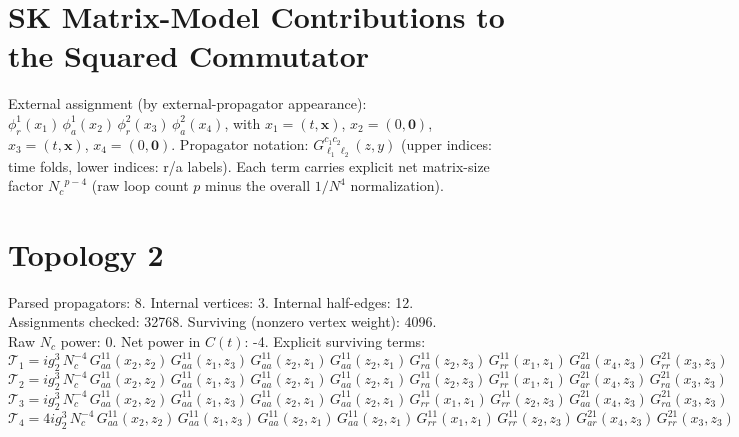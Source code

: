 \documentclass{article}
\begin{document}
\section*{SK Matrix-Model Contributions to the Squared Commutator}
External assignment (by external-propagator appearance): $\phi_r^1(x_1)\,\phi_a^1(x_2)\,\phi_r^2(x_3)\,\phi_a^2(x_4)$, with $x_1=(t,\mathbf{x})$, $x_2=(0,\mathbf{0})$, $x_3=(t,\mathbf{x})$, $x_4=(0,\mathbf{0})$.
Propagator notation: $G^{c_1 c_2}_{\ell_1\ell_2}(z,y)$ (upper indices: time folds, lower indices: r/a labels).
Each term carries explicit net matrix-size factor ${N_c}^{p-4}$ (raw loop count $p$ minus the overall $1/N^4$ normalization).
\section*{Topology 2}
\noindent Parsed propagators: 8. Internal vertices: 3. Internal half-edges: 12.\\
\noindent Assignments checked: 32768. Surviving (nonzero vertex weight): 4096.\\
\noindent Raw $N_c$ power: 0. Net power in $C(t)$: -4.
\noindent Explicit surviving terms:
\begin{equation*}
\mathcal{T}_{1} = i g_{2}^{3}\,N_c^{-4}\,G^{11}_{aa}\left(x_2,z_{2}\right) \, G^{11}_{aa}\left(z_{1},z_{3}\right) \, G^{11}_{aa}\left(z_{2},z_{1}\right) \, G^{11}_{aa}\left(z_{2},z_{1}\right) \, G^{11}_{ra}\left(z_{2},z_{3}\right) \, G^{11}_{rr}\left(x_1,z_{1}\right) \, G^{21}_{aa}\left(x_4,z_{3}\right) \, G^{21}_{rr}\left(x_3,z_{3}\right)
\end{equation*}
\begin{equation*}
\mathcal{T}_{2} = i g_{2}^{3}\,N_c^{-4}\,G^{11}_{aa}\left(x_2,z_{2}\right) \, G^{11}_{aa}\left(z_{1},z_{3}\right) \, G^{11}_{aa}\left(z_{2},z_{1}\right) \, G^{11}_{aa}\left(z_{2},z_{1}\right) \, G^{11}_{ra}\left(z_{2},z_{3}\right) \, G^{11}_{rr}\left(x_1,z_{1}\right) \, G^{21}_{ar}\left(x_4,z_{3}\right) \, G^{21}_{ra}\left(x_3,z_{3}\right)
\end{equation*}
\begin{equation*}
\mathcal{T}_{3} = i g_{2}^{3}\,N_c^{-4}\,G^{11}_{aa}\left(x_2,z_{2}\right) \, G^{11}_{aa}\left(z_{1},z_{3}\right) \, G^{11}_{aa}\left(z_{2},z_{1}\right) \, G^{11}_{aa}\left(z_{2},z_{1}\right) \, G^{11}_{rr}\left(x_1,z_{1}\right) \, G^{11}_{rr}\left(z_{2},z_{3}\right) \, G^{21}_{aa}\left(x_4,z_{3}\right) \, G^{21}_{ra}\left(x_3,z_{3}\right)
\end{equation*}
\begin{equation*}
\mathcal{T}_{4} = 4 i g_{2}^{3}\,N_c^{-4}\,G^{11}_{aa}\left(x_2,z_{2}\right) \, G^{11}_{aa}\left(z_{1},z_{3}\right) \, G^{11}_{aa}\left(z_{2},z_{1}\right) \, G^{11}_{aa}\left(z_{2},z_{1}\right) \, G^{11}_{rr}\left(x_1,z_{1}\right) \, G^{11}_{rr}\left(z_{2},z_{3}\right) \, G^{21}_{ar}\left(x_4,z_{3}\right) \, G^{21}_{rr}\left(x_3,z_{3}\right)
\end{equation*}
\end{document}
